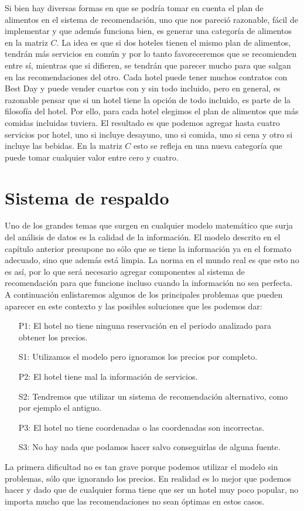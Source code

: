 \documentclass[12pt]{report}
\begin{document}
Si bien hay diversas formas en que se podría tomar en cuenta el plan de alimentos en el sistema de recomendación, uno que nos pareció razonable, fácil de implementar y que además funciona bien, es generar una categoría de alimentos en la matriz $C$. La idea es que si dos hoteles tienen el mismo plan de alimentos, tendrán más servicios en común y por lo tanto favoreceremos que se recomienden entre sí, mientras que si difieren, se tendrán que parecer mucho para que salgan en las recomendaciones del otro. Cada hotel puede tener muchos contratos con Best Day y puede vender cuartos con y sin todo incluido, pero en general, es razonable pensar que si un hotel tiene la opción de todo incluido, es parte de la filosofía del hotel. Por ello, para cada hotel elegimos el plan de alimentos que más comidas incluidas tuviera. El resultado es que podemos agregar hasta cuatro servicios por hotel, uno si incluye desayuno, uno si comida, uno si cena y otro si incluye las bebidas. En la matriz $C$ esto se refleja en una nueva categoría que puede tomar cualquier valor entre cero y cuatro.

\section{Sistema de respaldo}

Uno de los grandes temas que surgen en cualquier modelo matemático que surja del análisis de datos es la calidad de la información. El modelo descrito en el capítulo anterior presupone no sólo que se tiene la información ya en el formato adecuado, sino que además está limpia. La norma en el mundo real es que esto no es así, por lo que será necesario agregar componentes al sistema de recomendación para que funcione incluso cuando la información no sea perfecta. A continuación enlistaremos algunos de los principales problemas que pueden aparecer en este contexto y las posibles soluciones que les podemos dar:
\begin{itemize}
	\item[P1:] El hotel no tiene ninguna reservación en el periodo analizado para obtener los precios.
	\item[S1:] Utilizamos el modelo pero ignoramos los precios por completo.
	\item[P2:] El hotel tiene mal la información de servicios.
	\item[S2:] Tendremos que utilizar un sistema de recomendación alternativo, como por ejemplo el antiguo.
	\item[P3:] El hotel no tiene coordenadas o las coordenadas son incorrectas.
	\item[S3:] No hay nada que podamos hacer salvo conseguirlas de alguna fuente.
\end{itemize}
La primera dificultad no es tan grave porque podemos utilizar el modelo sin problemas, sólo que ignorando los precios. En realidad es lo mejor que podemos hacer y dado que de cualquier forma tiene que ser un hotel muy poco popular, no importa mucho que las recomendaciones no sean óptimas en estos casos.
\end{document}
